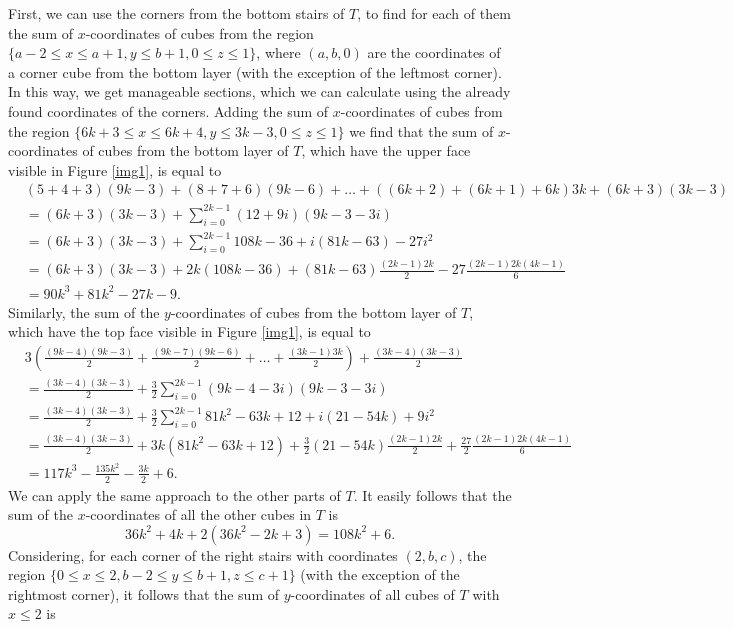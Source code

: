 \documentclass[12pt]{article}
\theoremstyle{remark}
\begin{document}
First, we can use the corners from the bottom stairs of $T$, to find for each of them the sum of $x$-coordinates of cubes from the region $\{ a-2 \leq x \leq a +1, y \leq b+1 , 0 \leq z \leq 1  \}$, where $(a,b,0)$ are the coordinates of a corner cube from the bottom layer (with the exception of the leftmost corner). In this way, we get manageable sections, which we can calculate using the already found coordinates of the corners. Adding the sum of $x$-coordinates of cubes from the region $\{ 6k+3 \leq x \leq 6k+4, y \leq 3k-3 , 0 \leq z \leq 1\}$ we find that the sum of $x$-coordinates of cubes from the bottom layer of $T$, which have the upper face visible in Figure \ref{img1}, is equal to \footnotesize 
\begin{align*}
&(5+4+3)(9k-3) + (8+7+6)(9k-6) + \dots + ((6k+2) + (6k+1) + 6k)3k +  (6k+3)(3k-3) \\
&=  (6k+3)(3k-3) + \sum_{i=0}^{2k-1} (12+9i)(9k-3-3i)\\
&=(6k+3)(3k-3) + \sum_{i=0}^{2k-1} 108k-36 + i(81k-63) - 27i^2 \\
& = (6k+3)(3k-3) + 2k(108k-36) + (81k-63) \frac{(2k-1)2k}{2} -27 \frac{(2k-1)2k(4k-1)}{6} \\
& = 90 k^3 + 81 k^2 - 27 k - 9.
\end{align*} \small
Similarly, the sum of the $y$-coordinates of cubes from the bottom layer of $T$, which have the top face visible in Figure  \ref{img1}, is equal to \footnotesize 
\begin{align*}
& 3 \left( \frac{(9k-4)(9k-3)}{2} + \frac{(9k-7)(9k-6)}{2} + \dots + \frac{(3k-1)3k}{2} \right) + \frac{(3k-4)(3k-3)}{2}\\
& = \frac{(3k-4)(3k-3)}{2} + \frac{3}{2} \sum_{i=0}^{2k-1} (9k-4 -3i)(9k-3-3i) \\
& =  \frac{(3k-4)(3k-3)}{2} + \frac{3}{2} \sum_{i=0}^{2k-1} 81k^2-63k + 12 + i(21-54k) + 9i^2 \\
&=  \frac{(3k-4)(3k-3)}{2} + 3k( 81k^2-63k + 12) + \frac{3}{2} (21-54k) \frac{(2k-1)2k}{2} + \frac{27}{2}   \frac{(2k-1)2k(4k-1)}{6} \\
& = 117 k^3 - \frac{135 k^2}{2} - \frac{3 k}{2} + 6. 
\end{align*} \small
We can apply the same approach to the other parts of $T$. It easily follows that the sum of the $x$-coordinates of all the other cubes in $T$ is
$$ 36 k^2 + 4 k + 2(36 k^2 - 2 k + 3) = 108 k^2 + 6.$$
Considering, for each corner of the right stairs with coordinates $(2,b,c)$, the region $\{0 \leq x \leq 2, b-2 \leq y \leq b+1, z \leq c+1\}$ (with the exception of the rightmost corner), it follows that the sum of $y$-coordinates of all cubes of $T$ with $x \leq 2$ is \footnotesize 
\end{document}
